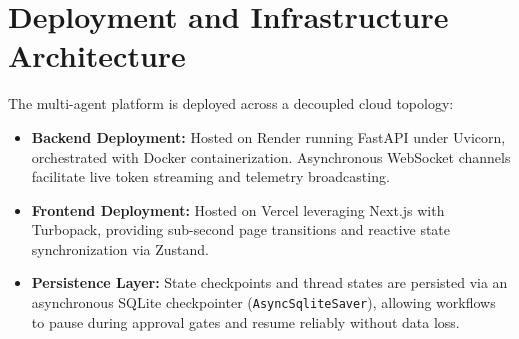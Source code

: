 \section{Deployment and Infrastructure Architecture}
The multi-agent platform is deployed across a decoupled cloud topology:
\begin{itemize}
    \item \textbf{Backend Deployment:} Hosted on Render running FastAPI under Uvicorn, orchestrated with Docker containerization. Asynchronous WebSocket channels facilitate live token streaming and telemetry broadcasting.
    \item \textbf{Frontend Deployment:} Hosted on Vercel leveraging Next.js with Turbopack, providing sub-second page transitions and reactive state synchronization via Zustand.
    \item \textbf{Persistence Layer:} State checkpoints and thread states are persisted via an asynchronous SQLite checkpointer (\texttt{AsyncSqliteSaver}), allowing workflows to pause during approval gates and resume reliably without data loss.
\end{itemize}
